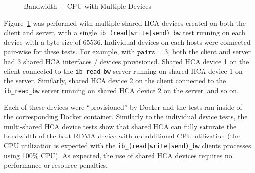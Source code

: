 \documentclass[12pt,titlepage]{article}
\begin{document}
\begin{figure}
	\centering
	\caption{Bandwidth + CPU with Multiple Devices}%
	\label{fig:shared_hca_multi_vdev}
\end{figure}

Figure~\ref{fig:shared_hca_multi_vdev} was performed with multiple shared HCA devices created on both the client and server, with a single \texttt{ib\_(read|write|send)\_bw} test running on each device with a byte size of 65536.
Individual devices on each hosts were connected pair-wise for these tests.
For example, with $\texttt{pairs} = 3$, both the client and server had 3 shared HCA interfaces / devices provisioned.
Shared HCA device 1 on the client connected to the \texttt{ib\_read\_bw} server running on shared HCA device 1 on the server.
Similarly, shared HCA device 2 on the client connected to the \texttt{ib\_read\_bw} server running on shared HCA device 2 on the server, and so on.

Each of these devices were ``provisioned'' by Docker and the tests ran inside of the corresponding Docker container.
Similarly to the individual device tests, the multi-shared HCA device tests show that shared HCA can fully saturate the bandwidth of the host RDMA device with no additional CPU utilization (the CPU utilization is expected with the \texttt{ib\_(read|write|send)\_bw} clients processes using 100\% CPU).
As expected, the use of shared HCA devices requires no performance or resource penalties.
\end{document}
